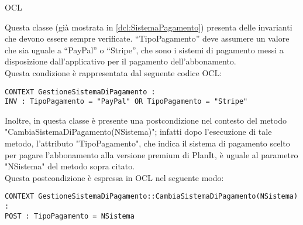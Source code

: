 \begin{listaPersonale}{OCL}
    \begin{center}
        
    \end{center}
    Questa classe (già mostrata in \ref{dcl:SistemaPagamento}) presenta delle invarianti che devono essere sempre verificate. “TipoPagamento” deve assumere un valore che sia uguale a “PayPal” o “Stripe”, che sono i sistemi di pagamento messi a disposizione dall’applicativo per il pagamento dell’abbonamento. \\
    Questa condizione è rappresentata dal seguente codice OCL:
    \begin{lstlisting}
CONTEXT GestioneSistemaDiPagamento :
INV : TipoPagamento = "PayPal" OR TipoPagamento = "Stripe"
    \end{lstlisting}        Inoltre, in questa classe è presente una postcondizione nel contesto del metodo "CambiaSistemaDiPagamento(NSistema)"; infatti dopo l'esecuzione di tale metodo, l'attributo "TipoPagamento", che indica il sistema di pagamento scelto per pagare l'abbonamento alla versione premium di PlanIt, è uguale al parametro "NSistema" del metodo sopra citato. \\
    Questa postcondizione è espressa in OCL nel seguente modo:
    \begin{lstlisting}
CONTEXT GestioneSistemaDiPagamento::CambiaSistemaDiPagamento(NSistema) :
POST : TipoPagamento = NSistema
    \end{lstlisting}





\end{listaPersonale}
